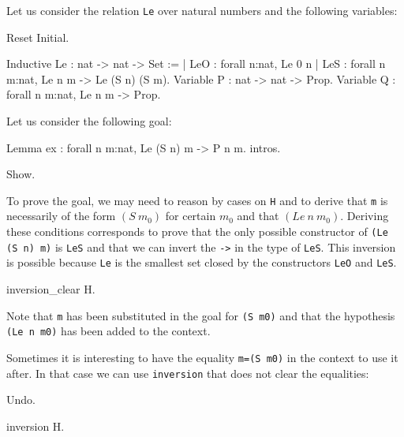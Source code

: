 \begin{coq_example*}
\begin{Variants}
\end{Variants}

\firstexample
{}
\label{inversion-examples}

Let us consider the relation \texttt{Le} over natural numbers and the
following variables:

\begin{coq_eval}
Reset Initial.
\end{coq_eval}

\begin{coq_example*}
Inductive Le : nat -> nat -> Set :=
  | LeO : forall n:nat, Le 0 n
  | LeS : forall n m:nat, Le n m -> Le (S n) (S m).
Variable P : nat -> nat -> Prop.
Variable Q : forall n m:nat, Le n m -> Prop.
\end{coq_example*}

Let us consider the following goal:

\begin{coq_eval}
Lemma ex : forall n m:nat, Le (S n) m -> P n m.
intros.
\end{coq_eval}

\begin{coq_example}
Show.
\end{coq_example}

To prove the goal, we may need to reason by cases on \texttt{H} and to
derive that \texttt{m} is necessarily of
the form $(S~m_0)$ for certain $m_0$ and that $(Le~n~m_0)$.
Deriving these conditions corresponds to prove that the
only possible constructor of \texttt{(Le (S n) m)} is
\texttt{LeS} and that we can invert the
\texttt{->} in the type  of \texttt{LeS}.
This inversion is possible because \texttt{Le} is the smallest set closed by
the constructors \texttt{LeO} and \texttt{LeS}.

\begin{coq_example}
inversion_clear H.
\end{coq_example}

Note that \texttt{m} has been substituted in the goal for \texttt{(S m0)}
and that the hypothesis \texttt{(Le n m0)} has been added to the
context.

Sometimes it is
interesting to have the equality \texttt{m=(S m0)} in the
context to use it after. In that case we can use \texttt{inversion} that
does not clear the equalities:

\begin{coq_eval}
Undo.
\end{coq_eval}

\begin{coq_example}
inversion H.
\end{coq_example}


\end{coq_example*}
